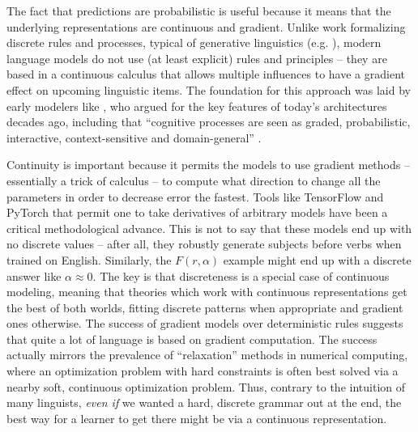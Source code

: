 \documentclass[output=paper,colorlinks,citecolor=brown
]{langscibook}
\begin{document}
The fact that predictions are probabilistic is useful because it means that the underlying representations are continuous and gradient. Unlike work formalizing discrete rules and processes, typical of generative linguistics (e.g. \citealt{chomsky1956three,chomsky1995minimalist,collins2016formalization,chomsky1957syntactic,pinker1988language}), modern language models do not use (at least explicit) rules and principles -- they are based in a continuous calculus that allows multiple influences to have a gradient effect on upcoming linguistic items. The foundation for this approach was laid by early modelers like \citet{rumelhart1986learning}, who argued for the key features of today's architectures decades ago, including that ``cognitive processes are seen as graded, probabilistic, interactive, context-sensitive and domain-general'' \citep{mcclelland2002rules}.

Continuity is important because it permits the models to use gradient methods -- essentially a trick of calculus -- to compute what direction to change all the parameters in order to decrease error the fastest. Tools like TensorFlow and PyTorch that permit one to take derivatives of arbitrary models have been a critical methodological advance. This is not to say that these models end up with no discrete values -- after all, they robustly generate subjects before verbs when trained on English. Similarly, the $F(r,\alpha)$ example might end up with a discrete answer like $\alpha \approx 0$. The key is that discreteness is a special case of continuous modeling, meaning that theories which work with continuous representations get the best of both worlds, fitting discrete patterns when appropriate and gradient ones otherwise. The success of gradient models over deterministic rules suggests that quite a lot of language is based on gradient computation. The success actually mirrors the prevalence of ``relaxation'' methods in numerical computing, where an optimization problem with hard constraints is often best solved via a nearby soft, continuous optimization problem. Thus, contrary to the intuition of many linguists, \textit{even if} we wanted a hard, discrete grammar out at the end, the best way for a learner to get there might be via a continuous representation.

\end{document}
